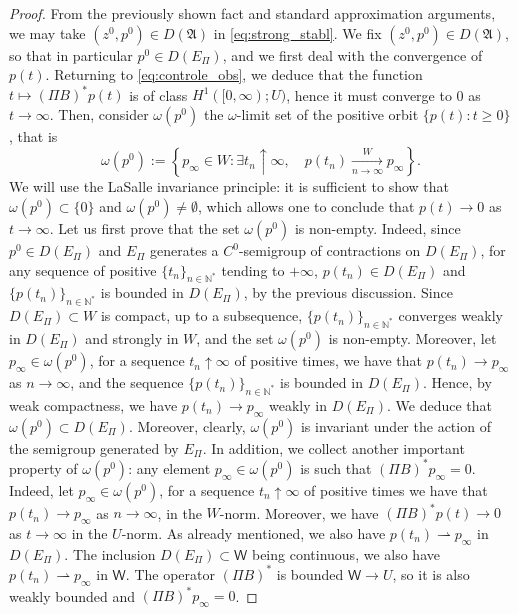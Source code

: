 \documentclass[10pt]{article}
\begin{document}
\begin{proof}
From the previously shown fact and standard approximation arguments, we may take $(z^0,p^0) \in D(\mathfrak{A})$ in \eqref{eq:strong_stabl}. We fix $(z^0,p^0) \in D(\mathfrak{A})$, so that in particular $p^0 \in D(E_\Pi)$, and we first deal with the convergence of $p(t)$. Returning  to \eqref{eq:controle_obs}, we deduce that the function $t \mapsto (\Pi B)^*p(t)$ is of class $H^1([0,\infty);U)$, hence it must converge to 0 as $t \rightarrow \infty$. Then, consider $\omega(p^0)$ the $\omega$-limit set of the positive orbit $\lbrace p(t) : t\geq 0\rbrace$, that is
\[
\omega(p^0) := \left\lbrace p_\infty \in W : \exists t_n \uparrow \infty,\quad p(t_n) \xrightarrow[n \rightarrow \infty]{W} p_\infty \right\rbrace.
\]
We will use the LaSalle invariance principle: it is sufficient to show that $\omega(p^0) \subset \{ 0 \}$ and $\omega(p^0) \neq \emptyset$, which allows one to conclude that $p(t) \rightarrow 0$ as $t \rightarrow \infty$. Let us first prove that the set $\omega(p^0)$ is non-empty. Indeed, since $p^0 \in D(E_\Pi)$ and $E_\Pi$ generates a $C^0$-semigroup  of contractions on $ D(E_\Pi)$, for any sequence of positive  $\{t_n\}_{n\in\mathbb N^*}$ tending to $+\infty$, $p(t_n) \in D(E_\Pi)$ and $\{p(t_n)\}_{n\in\mathbb N^*}$ is bounded in $D(E_\Pi)$, by the previous discussion. Since $D(E_\Pi) \subset W$ is compact,  up to a subsequence, $\{p(t_n)\}_{n\in\mathbb N^*}$ converges weakly in $D(E_\Pi)$ and  strongly in $W$, and the set $\omega(p^0)$ is non-empty. Moreover, let $p_\infty \in \omega(p^0)$, for a sequence $t_n \uparrow \infty$ of positive times, we have that $p(t_n) \to p_\infty$ as $n \to \infty$, and the sequence $\{p(t_n)\}_{n\in\mathbb N^*}$ is bounded in $D(E_\Pi)$. Hence, by weak compactness, we have $p(t_n) \to p_\infty$ weakly in $D(E_\Pi)$. We deduce that $\omega(p^0) \subset D(E_\Pi)$. Moreover, clearly, $\omega(p^0)$ is invariant under the action of the semigroup generated by $E_\Pi$. In addition, we collect another important property of $\omega(p^0)$: any element $p_\infty \in \omega(p^0)$ is such that $(\Pi B)^* p_\infty = 0$. Indeed, let $p_\infty \in \omega(p^0)$, for a sequence $t_n \uparrow \infty$ of positive times we have that $p(t_n) \to p_\infty$ as $n \to \infty$, in the $W$-norm. Moreover, we have $(\Pi B)^* p(t) \to 0$ as $t \to \infty$ in the $U$-norm. As already mentioned, we also have $p(t_n) \rightharpoonup p_\infty$ in $D(E_\Pi)$. The inclusion $D(E_\Pi) \subset \mathsf{W}$ being continuous, we also have $p(t_n) \rightharpoonup p_\infty $ in $\mathsf{W}$. The operator $(\Pi B)^*$ is bounded $\mathsf{W} \rightarrow U$, so it is also weakly bounded and $(\Pi B)^*p_\infty = 0$. 


\end{proof}
\end{document}
